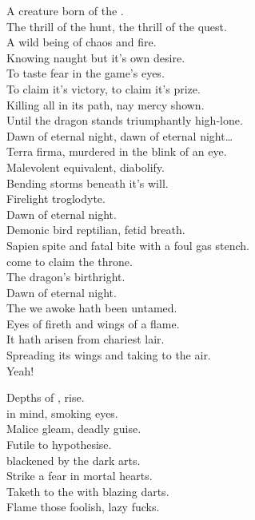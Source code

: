 
A creature born of the . \\
The thrill of the hunt, the thrill of the quest. \\
A wild being of chaos and fire. \\
Knowing naught but it's own desire. \\
To taste fear in the game's eyes. \\
To claim it's victory, to claim it's prize. \\
Killing all in its path, nay mercy shown. \\
Until the dragon stands triumphantly high-lone. \\

Dawn of eternal night, dawn of eternal night… \\

Terra firma,  murdered in the blink of an eye. \\
Malevolent equivalent, diabolify. \\
Bending storms beneath it's will. \\
Firelight troglodyte. \\
Dawn of eternal night. \\

Demonic bird reptilian,  fetid breath. \\
Sapien spite and fatal bite with a foul gas stench. \\
 come to claim the throne. \\
The dragon's birthright. \\
Dawn of eternal night. \\

The  we awoke hath been untamed. \\
Eyes of fireth and wings of a flame. \\
It hath arisen from chariest lair. \\
Spreading its wings and taking to the air. \\
Yeah! \\




Depths of ,  rise. \\
 in mind, smoking eyes. \\
Malice gleam, deadly guise. \\
Futile to hypothesise. \\
 blackened by the dark arts. \\
Strike a fear in mortal hearts. \\
Taketh to the  with blazing darts. \\
Flame those foolish, lazy fucks. \\

